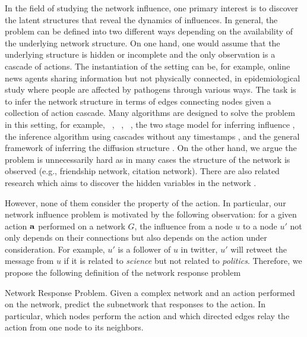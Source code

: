 {In the field of studying the network influence, one primary interest is to discover the latent structures that reveal the dynamics of influences.
In general, the problem can be defined into two different ways depending on the availability of the underlying network structure.
On one hand, one would assume that the underlying structure is hidden or incomplete and the only observation is a cascade of actions.
The instantiation of the setting can be, for example, online news agents sharing information but not physically connected, in epidemiological study where people are affected by pathogens through various ways.
The task is to infer the network structure in terms of edges connecting nodes given a collection of action cascade.
Many algorithms are designed to solve the problem in this setting, for example, \netinf\ \citep{GomezRodriguez10inferring}, \netrate\ \citep{Rodrigues11unconvering}, \ \citep{Du12learning}, the two stage model for inferring influence \citep{Du14influence}, the inference algorithm using cascades without any timestamps \citep{Amin14learning}, and the general framework of inferring the diffusion structure \citep{Daneshmand14estimating}.
On the other hand, we argue the problem is unnecessarily hard as in many cases the structure of the network is observed (e.g., friendship network, citation network).
There are also related research which aims to discover the hidden variables in the network \citep{Lovrek08prediction,Goyal10learning}.

However, none of them consider the property of the action.
In particular, our network influence problem is motivated by the following observation: for a given action $\mathbf {a}$ performed on a network $G$, the influence from a node $u$ to a node $u'$ not only depends on their connections but also depends on the action under consideration.
For example, $u'$ is a follower of $u$ in twitter, $u'$ will retweet the message from $u$ if it is related to \textit{science} but not related to \textit{politics}.
Therefore, we propose the following definition of the network response problem
\begin{definition}{Network Response Problem.}
	Given a complex network and an action performed on the network, predict the subnetwork that responses to the action. In particular, which nodes perform the action and which directed edges relay the action from one node to its neighbors.
\end{definition}

}

